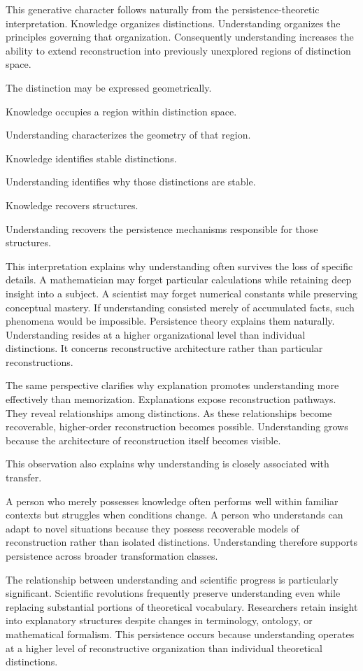 \documentclass[12pt,oneside]{article}
\theoremstyle{definition}
\begin{document}
This generative character follows naturally from the persistence-theoretic interpretation. Knowledge organizes distinctions. Understanding organizes the principles governing that organization. Consequently understanding increases the ability to extend reconstruction into previously unexplored regions of distinction space.

The distinction may be expressed geometrically.

Knowledge occupies a region within distinction space.

Understanding characterizes the geometry of that region.

Knowledge identifies stable distinctions.

Understanding identifies why those distinctions are stable.

Knowledge recovers structures.

Understanding recovers the persistence mechanisms responsible for those structures.

This interpretation explains why understanding often survives the loss of specific details. A mathematician may forget particular calculations while retaining deep insight into a subject. A scientist may forget numerical constants while preserving conceptual mastery. If understanding consisted merely of accumulated facts, such phenomena would be impossible. Persistence theory explains them naturally. Understanding resides at a higher organizational level than individual distinctions. It concerns reconstructive architecture rather than particular reconstructions.

The same perspective clarifies why explanation promotes understanding more effectively than memorization. Explanations expose reconstruction pathways. They reveal relationships among distinctions. As these relationships become recoverable, higher-order reconstruction becomes possible. Understanding grows because the architecture of reconstruction itself becomes visible.

This observation also explains why understanding is closely associated with transfer.

A person who merely possesses knowledge often performs well within familiar contexts but struggles when conditions change. A person who understands can adapt to novel situations because they possess recoverable models of reconstruction rather than isolated distinctions. Understanding therefore supports persistence across broader transformation classes.

The relationship between understanding and scientific progress is particularly significant. Scientific revolutions frequently preserve understanding even while replacing substantial portions of theoretical vocabulary. Researchers retain insight into explanatory structures despite changes in terminology, ontology, or mathematical formalism. This persistence occurs because understanding operates at a higher level of reconstructive organization than individual theoretical distinctions.
\end{document}
